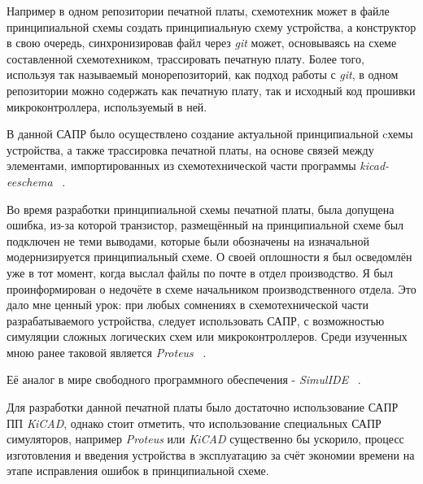 Например в одном репозитории печатной платы,
схемотехник может в файле принципиальной схемы
создать принципиальную схему устройства,
а конструктор в свою очередь, синхронизировав файл
через \textit{git} может,
основываясь на схеме составленной схемотехником,
трассировать печатную плату. Более того, используя
так называемый монорепозиторий, как подход работы с \textit{git},
в одном репозитории можно содержать как печатную плату,
так и исходный код прошивки микроконтроллера,
используемый в ней.

В данной САПР было осуществлено создание
актуальной принципиальной cхемы устройства,
а также трассировка печатной платы, на основе связей между элементами,
импортированных из схемотехнической
части программы \textit{kicad-eeschema} ~\cite{kicad-doc-eeschema}.


Во время разработки принципиальной схемы печатной платы,
была допущена ошибка, из-за которой транзистор,
размещённый на принципиальной схеме был подключен не теми выводами,
которые были обозначены на изначальной модернизируется
принципиальный схеме.
О своей оплошности я был осведомлён уже в тот момент,
когда выслал файлы по почте в отдел производство.
Я был проинформирован о недочёте в схеме начальником производственного отдела.
Это дало мне ценный урок:
при любых сомнениях в схемотехнической части разрабатываемого устройства,
следует использовать САПР,
с возможностью симуляции сложных логических схем или микроконтроллеров.
Среди изученных мною ранее
таковой является \textit{Proteus} ~\cite{Proteus-Simulation}.

Её аналог в мире свободного программного обеспечения - \textit{SimulIDE} ~\cite{SimulIDE}.
%

Для разработки данной печатной платы было достаточно
использование САПР ПП \textit{KiCAD},
однако стоит отметить, что использование специальных САПР симуляторов,
например \textit{Proteus} или \textit{KiCAD} существенно бы ускорило,
процесс изготовления и введения устройства в эксплуатацию
за счёт экономии времени на этапе исправления ошибок в принципиальной схеме.

\newpage

